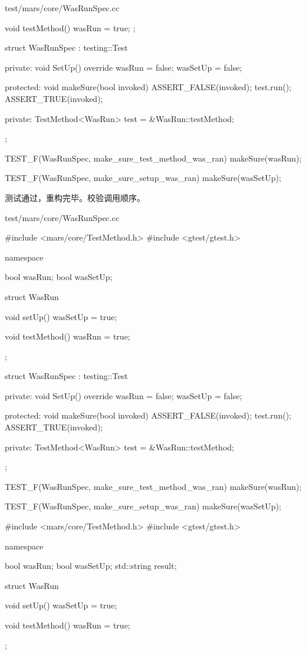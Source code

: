 \begin{content}
\begin{diff}{test/mars/core/WasRunSpec.cc}
\begin{minicpp}
{{    void testMethod() {
      wasRun = true;
    }
  };

  struct WasRunSpec : testing::Test {
  private:
    void SetUp() override {
      wasRun = false;
      wasSetUp = false;
    }

  protected:
    void makeSure(bool invoked) {
      ASSERT_FALSE(invoked);
      test.run();
      ASSERT_TRUE(invoked);      
    }

  private:
    TestMethod<WasRun> test = &WasRun::testMethod;
  };
}

TEST_F(WasRunSpec, make_sure_test_method_was_ran) {
  makeSure(wasRun);
}

TEST_F(WasRunSpec, make_sure_setup_was_ran) {
  makeSure(wasSetUp);
}
\end{minicpp}
\end{diff}

测试通过，重构完毕。校验调用顺序。

\begin{diff}{test/mars/core/WasRunSpec.cc}
\begin{minicpp}
#include <mars/core/TestMethod.h>
#include <gtest/gtest.h>

namespace {
  bool wasRun;
  bool wasSetUp;

  struct WasRun {
    void setUp() {
      wasSetUp = true;
    }

    void testMethod() {
      wasRun = true;
    }
  };

  struct WasRunSpec : testing::Test {
  private:
    void SetUp() override {
      wasRun = false;
      wasSetUp = false;
    }

  protected:
    void makeSure(bool invoked) {
      ASSERT_FALSE(invoked);
      test.run();
      ASSERT_TRUE(invoked);      
    }

  private:
    TestMethod<WasRun> test = &WasRun::testMethod;
  };
}

TEST_F(WasRunSpec, make_sure_test_method_was_ran) {
  makeSure(wasRun);
}

TEST_F(WasRunSpec, make_sure_setup_was_ran) {
  makeSure(wasSetUp);
}
\end{minicpp}
\tcblower
\begin{minicpp}
#include <mars/core/TestMethod.h>
#include <gtest/gtest.h>

namespace {
  bool wasRun;
  bool wasSetUp;
  std::string result;

  struct WasRun {
    void setUp() {
      wasSetUp = true;
    }

    void testMethod() {
      wasRun = true;
    }
  };

}
\end{minicpp}
\end{diff}
\end{content}
